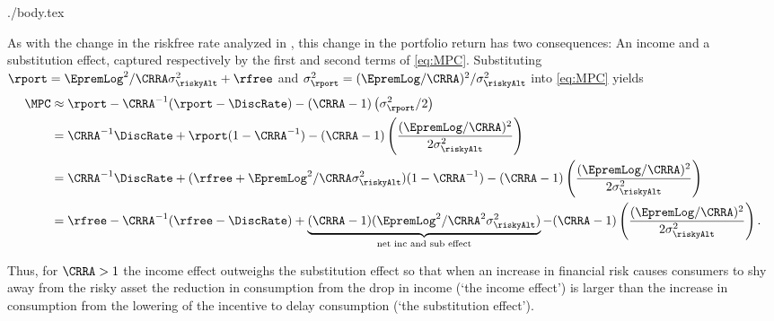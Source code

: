 \documentclass{handout}
\begin{document}
\begin{verbatimwrite}{./body.tex}
{As with the change in the riskfree rate analyzed in , this change in the portfolio
return has two consequences: An income and a substitution effect,
captured respectively by the first and second terms of \eqref{eq:MPC}.
Substituting $\rport = \EpremLog^{2}/\CRRA \sigma^{2}_{\riskyAlt}+\rfree$ and $\sigma_{\rport}^{2}=(\EpremLog/\CRRA)^2/\sigma_{\riskyAlt}^{2}$ into \eqref{eq:MPC} yields
\begin{equation}\begin{gathered}\begin{aligned}
        \MPC & \approx  {\rport}-\CRRA^{-1}(\rport-\DiscRate) - (\CRRA-1)\left(\sigma_{\rport}^{2}/2\right) \label{eq:MPCsub}
\\      & =  \CRRA^{-1}\DiscRate+{\rport}(1-\CRRA^{-1}) - (\CRRA-1)\left(\frac{(\EpremLog/\CRRA)^{2}}{2 \sigma_{\riskyAlt}^{2}}\right)
\\      & =  \CRRA^{-1}\DiscRate+(\rfree+\EpremLog^{2}/\CRRA \sigma^{2}_{\riskyAlt})(1-\CRRA^{-1}) - (\CRRA-1)\left(\frac{(\EpremLog/\CRRA)^{2}}{2 \sigma_{\riskyAlt}^{2}}\right)
\\      & =  \rfree-\CRRA^{-1}(\rfree-\DiscRate)+\underbrace{(\CRRA-1)(\EpremLog^{2}/\CRRA^{2} \sigma^{2}_{\riskyAlt})}_{\text{net inc and sub effect}} - (\CRRA-1)\left(\frac{(\EpremLog/\CRRA)^{2}}{2 \sigma_{\riskyAlt}^{2}}\right)
.
\end{aligned}\end{gathered}\end{equation}

Thus, for $\CRRA > 1$ the income effect outweighs the substitution
effect so that when an increase in financial risk causes consumers to
shy away from the risky asset the reduction in consumption from the
drop in income (`the income effect') is larger than the increase in
consumption from the lowering of the incentive to delay consumption
(`the substitution effect').

}
\end{verbatimwrite}
\end{document}
